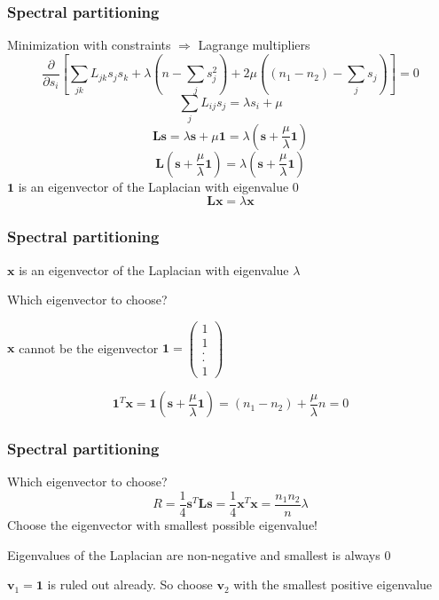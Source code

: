 \documentclass{beamer}
\begin{document}
\begin{frame}
    \frametitle{Spectral partitioning}
    \centering
Minimization with constraints $\Rightarrow$ Lagrange multipliers
    $$\frac{\partial}{\partial s_i}\left[\sum\limits_{jk}L_{jk}s_js_k + \lambda\left(n-\sum\limits_{j}s_j^2\right) + 2\mu\left((n_1-n_2)-\sum\limits_js_j\right)\right] = 0$$
    \pause
    $$\sum\limits_jL_{ij}s_j = \lambda s_i + \mu$$
\justifying
    \pause
$${\mathbf L}{\mathbf s} = \lambda {\mathbf s} + \mu {\mathbf 1} = \lambda \left({\mathbf s} + \frac{\mu}{\lambda}{\mathbf 1}\right)$$
    $${\mathbf L}\left({\mathbf s} + \frac{\mu}{\lambda}{\mathbf 1}\right) = \lambda \left({\mathbf s} + \frac{\mu}{\lambda}{\mathbf 1}\right)$$
    \centering
    ${\mathbf 1}$ is an eigenvector of the Laplacian with eigenvalue $0$
    $${\mathbf L}{\mathbf x}=\lambda {\mathbf x}$$
\end{frame}
\begin{frame}
    \frametitle{Spectral partitioning}
    \centering
    ${\mathbf x}$ is an eigenvector of the Laplacian with eigenvalue $\lambda$ 

    \vspace{1em}
    Which eigenvector to choose?

    \vspace{1em}
    ${\mathbf x}$ cannot be the eigenvector ${\mathbf 1} = \begin{pmatrix}1\\1\\.\\.\\1\end{pmatrix}$

        $${\mathbf 1}^T{\mathbf x} = {\mathbf 1}\left({\mathbf s} + \frac{\mu}{\lambda}{\mathbf 1}\right) = (n_1-n_2) + \frac{\mu}{\lambda}n = 0$$
\end{frame}
\begin{frame}
    \frametitle{Spectral partitioning}
    \centering
    Which eigenvector to choose?
    $$R = \frac{1}{4}{\mathbf s}^T{\mathbf L}{\mathbf s} = \frac{1}{4}{\mathbf x}^T{\mathbf x} = \frac{n_1n_2}{n}\lambda$$
    Choose the eigenvector with smallest possible eigenvalue!

    \vspace{1em}
    Eigenvalues of the Laplacian are non-negative and smallest is always $0$

    \vspace{1em}
    ${\mathbf v}_1 = {\mathbf 1}$ is ruled out already. So choose ${\mathbf v}_2$ with the smallest positive eigenvalue
\end{frame}
\end{document}
